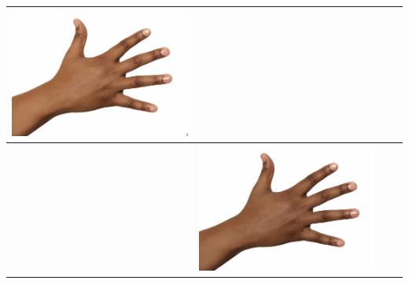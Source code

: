 \begin{longtable}{|N||c|c|c|}
  \begin{minipage}{.29\textwidth}
    \includegraphics[width=\textwidth,height=\textheight,keepaspectratio]{../rc_test/outputs/20170516_proportional_test/hand_dark_to_hand_brown.jpg}
  \end{minipage} \\
\hline  \label{row:prop_test_hand_dark_to_hand_light} &
  \begin{minipage}{.29\textwidth}
    \includegraphics[width=\textwidth,height=\textheight,keepaspectratio]{../inputs/hand_dark.jpg}
  \end{minipage} & 
  \begin{minipage}{.29\textwidth}

\end{minipage}
\end{longtable}
